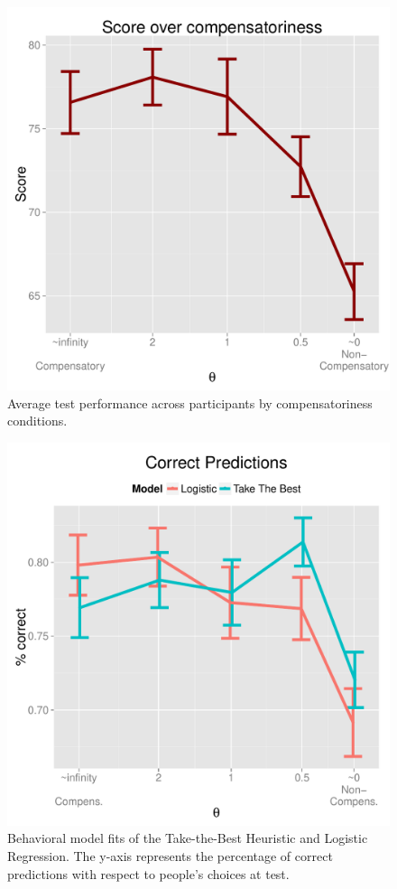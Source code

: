 \documentclass[10pt,letterpaper]{article}
\begin{document}
\begin{figure}[htb!]
\centering
\includegraphics[scale=0.4]{score.pdf}
\caption{Average test performance across participants by compensatoriness conditions.}
\label{performance}	
\end{figure}
\begin{figure}[htb!]
\centering
\includegraphics[scale=0.4]{percentage.pdf}
\caption{Behavioral model fits of the Take-the-Best Heuristic and Logistic Regression. The y-axis represents the percentage of correct predictions with respect to people's choices at test.}
\label{percentage}
\end{figure}
\end{document}
